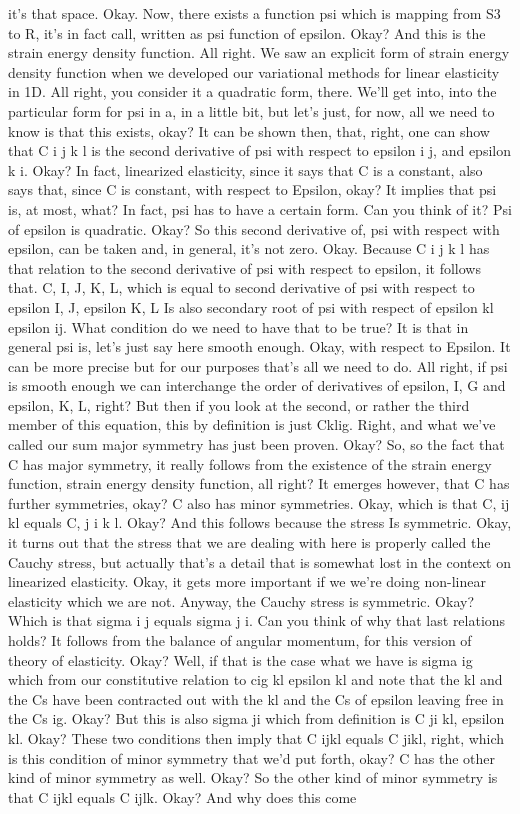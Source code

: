 \documentclass[10pt]{article}
\begin{document}
it's that space. Okay. Now, there exists a function psi which is mapping from S3 to R, it's in fact call, written as psi function of epsilon. Okay? And this is the strain energy density function. All right. We saw an explicit form of strain energy density function when we developed our variational methods for linear elasticity in 1D. All right, you consider it a quadratic form, there. We'll get into, into the particular form for psi in a, in a little bit, but let's just, for now, all we need to know is that this exists, okay? It can be shown then, that, right, one can show that C i j k l is the second derivative of psi with respect to epsilon i j, and epsilon k i. Okay? In fact, linearized elasticity, since it says that C is a constant, also says that, since C is constant, with respect to Epsilon, okay? It implies that psi is, at most, what? In fact, psi has to have a certain form. Can you think of it? Psi of epsilon is quadratic. Okay? So this second derivative of, psi with respect with epsilon, can be taken and, in general, it's not zero. Okay. Because C i j k l has that relation to the second derivative of psi with respect to epsilon, it follows that. C, I, J, K, L, which is equal to second derivative of psi with respect to epsilon I, J, epsilon K, L Is also secondary root of psi with respect of epsilon kl epsilon ij. What condition do we need to have that to be true? It is that in general psi is, let's just say here smooth enough. Okay, with respect to Epsilon. It can be more precise but for our purposes that's all we need to do. All right, if psi is smooth enough we can interchange the order of derivatives of epsilon, I, G and epsilon, K, L, right? But then if you look at the second, or rather the third member of this equation, this by definition is just Cklig. Right, and what we've called our sum major symmetry has just been proven. Okay? So, so the fact that C has major symmetry, it really follows from the existence of the strain energy function, strain energy density function, all right? It emerges however, that C has further symmetries, okay? C also has minor symmetries. Okay, which is that C, ij kl equals C, j i k l. Okay? And this follows because the stress Is symmetric. Okay, it turns out that the stress that we are dealing with here is properly called the Cauchy stress, but actually that's a detail that is somewhat lost in the context on linearized elasticity. Okay, it gets more important if we we're doing non-linear elasticity which we are not. Anyway, the Cauchy stress is symmetric. Okay? Which is that sigma i j equals sigma j i. Can you think of why that last relations holds? It follows from the balance of angular momentum, for this version of theory of elasticity. Okay? Well, if that is the case what we have is sigma ig which from our constitutive relation to cig kl epsilon kl and note that the kl and the Cs have been contracted out with the kl and the Cs of epsilon leaving free in the Cs ig. Okay? But this is also sigma ji which from definition is C ji kl, epsilon kl. Okay? These two conditions then imply that C ijkl equals C jikl, right, which is this condition of minor symmetry that we'd put forth, okay? C has the other kind of minor symmetry as well. Okay? So the other kind of minor symmetry is that C ijkl equals C ijlk. Okay? And why does this come 
\end{document}
